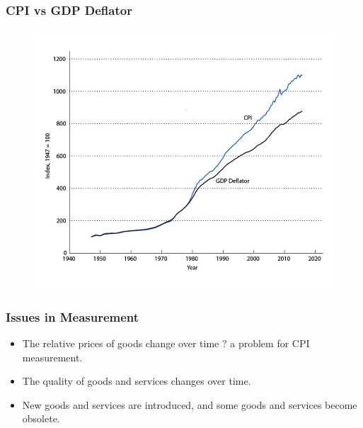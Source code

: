 \documentclass{beamer}
\begin{document}
\begin{frame}
\frametitle[alignment=center]{CPI vs GDP Deflator}
\begin{figure}
\includegraphics[scale=0.6]{Figures/W_Fig_2pt3.png}
\end{figure}
\end{frame}

    \begin{frame}
\frametitle[alignment=center]{Issues in Measurement}
\begin{itemize}
\item The relative prices of goods change over time ? a problem for CPI measurement.
\item The quality of goods and services changes over time.
\item New goods and services are introduced, and some goods and services become obsolete.
\end{itemize}
\end{frame}
\end{document}

